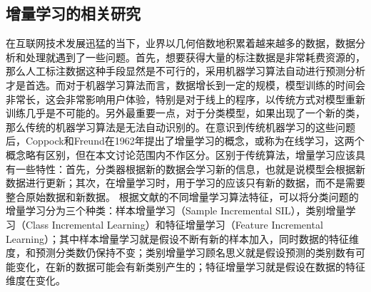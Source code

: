\subsection {增量学习的相关研究}
在互联网技术发展迅猛的当下，业界以几何倍数地积累着越来越多的数据，数据分析和处理就遇到了一些问题。首先，想要获得大量的标注数据是非常耗费资源的，那么人工标注数据这种手段显然是不可行的，采用机器学习算法自动进行预测分析才是首选。而对于机器学习算法而言，数据增长到一定的规模，模型训练的时间会非常长，这会非常影响用户体验，特别是对于线上的程序，以传统方式对模型重新训练几乎是不可能的。另外最重要一点，对于分类模型，如果出现了一个新的类，那么传统的机器学习算法是无法自动识别的。在意识到传统机器学习的这些问题后，Coppock和Freund在1962年提出了增量学习的概念\cite{coppock1962all}，或称为在线学习，这两个概念略有区别，但在本文讨论范围内不作区分。区别于传统算法，增量学习应该具有一些特性：首先，分类器根据新的数据会学习新的信息，也就是说模型会根据新数据进行更新；其次，在增量学习时，用于学习的应该只有新的数据，而不是需要整合原始数据和新数据。 根据文献的不同增量学习算法特征，可以将分类问题的增量学习分为三个种类：样本增量学习（Sample Incremental SIL），类别增量学习（Class Incremental Learning）和特征增量学习（Feature Incremental Learning）\cite{zhong2017survey}；其中样本增量学习就是假设不断有新的样本加入，同时数据的特征维度，和预测分类数仍保持不变；类别增量学习顾名思义就是假设预测的类别数有可能变化，在新的数据可能会有新类别产生的；特征增量学习就是假设在数据的特征维度在变化。

